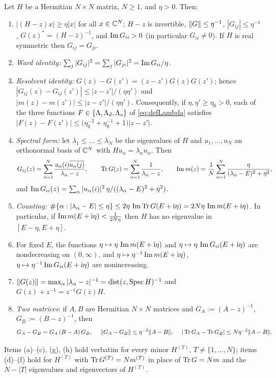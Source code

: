 \begin{lemma}\label{lem:basic}
Let $H$ be a Hermitian $N\times N$ matrix, $N\ge1$, and $\eta>0$. Then:
\begin{enumerate}[label=\textup{(\alph*)},leftmargin=2.2em,itemsep=1pt]
\item $|(H-z)x|\ge\eta|x|$ for all $x\in\mathbb{C}^N$; $H-z$ is invertible, $\|G\|\le\eta^{-1}$, $|G_{ij}|\le\eta^{-1}$, $G(z)^*=(H-\bar z)^{-1}$, and $\operatorname{Im} G_{ii}>0$ (in particular $G_{ii}\ne0$).
If $H$ is real symmetric then $G_{ij}=G_{ji}$.
\item \emph{Ward identity:} $\sum_j|G_{ij}|^2=\sum_j|G_{ji}|^2=\operatorname{Im} G_{ii}/\eta$.
\item \emph{Resolvent identity:} $G(z)-G(z')=(z-z')G(z)G(z')$; hence $|G_{ij}(z)-G_{ij}(z')|\le|z-z'|/(\eta\eta')$ and $|m(z)-m(z')|\le|z-z'|/(\eta\eta')$.
Consequently, if $\eta,\eta'\ge\eta_0>0$, each of the three functions $F\in\{\Lambda,\Lambda_d,\Lambda_o\}$ of \eqref{eq:defLambda} satisfies $|F(z)-F(z')|\le\big(\eta_0^{-2}+\eta_0^{-1}+1\big)|z-z'|$.
\item \emph{Spectral form:} let $\lambda_1\le\dots\le\lambda_N$ be the eigenvalues of $H$ and $u_1,\dots,u_N$ an orthonormal basis of $\mathbb{C}^N$ with $Hu_\alpha=\lambda_\alpha u_\alpha$. Then
\[
 G_{ij}(z)=\sum_{\alpha=1}^N\frac{u_\alpha(i)\overline{u_\alpha(j)}}{\lambda_\alpha-z},\qquad\operatorname{Tr} G(z)=\sum_{\alpha=1}^N\frac1{\lambda_\alpha-z},\qquad
 \operatorname{Im} m(z)=\frac1N\sum_{\alpha=1}^N\frac{\eta}{(\lambda_\alpha-E)^2+\eta^2},
\]
and $\operatorname{Im} G_{ii}(z)=\sum_\alpha|u_\alpha(i)|^2\,\eta/((\lambda_\alpha-E)^2+\eta^2)$.
\item \emph{Counting:} $\#\{\alpha:|\lambda_\alpha-E|\le\eta\}\le2\eta\,\operatorname{Im}\operatorname{Tr} G(E+\mathrm{i}\eta)=2N\eta\,\operatorname{Im} m(E+\mathrm{i}\eta)$. In particular, if $\operatorname{Im} m(E+\mathrm{i}\eta)<\frac1{2N\eta}$ then $H$ has no eigenvalue in $[E-\eta,E+\eta]$.
\item For fixed $E$, the functions $\eta\mapsto\eta\,\operatorname{Im} m(E+\mathrm{i}\eta)$ and $\eta\mapsto\eta\,\operatorname{Im} G_{ii}(E+\mathrm{i}\eta)$ are nondecreasing on $(0,\infty)$, and $\eta\mapsto\eta^{-1}\operatorname{Im} m(E+\mathrm{i}\eta)$, $\eta\mapsto\eta^{-1}\operatorname{Im} G_{ii}(E+\mathrm{i}\eta)$ are nonincreasing.
\item $\|G(z)\|=\max_\alpha|\lambda_\alpha-z|^{-1}=\operatorname{dist}(z,\operatorname{Spec}H)^{-1}$ and $G(z)+z^{-1}=z^{-1}G(z)H$.
\item \emph{Two matrices}: if $A,B$ are Hermitian $N\times N$ matrices and $G_A:=(A-z)^{-1}$, $G_B:=(B-z)^{-1}$, then
\[
 G_A-G_B=G_A\,(B-A)\,G_B,\quad\ \norm{G_A-G_B}\le\eta^{-2}\norm{A-B},\quad\ |\tr G_A-\tr G_B|\le N\eta^{-2}\norm{A-B}.
\]
\end{enumerate}
Items \textup{(a)--(c), (g), (h)} hold verbatim for every minor $H^{(T)}$, $T\ne\{1,\dots,N\}$; items \textup{(d)--(f)} hold for $H^{(T)}$ with $\operatorname{Tr} G^{(T)}=Nm^{(T)}$ in place of $\operatorname{Tr} G=Nm$
and the $N-|T|$ eigenvalues and eigenvectors of $H^{(T)}$.
\end{lemma}
